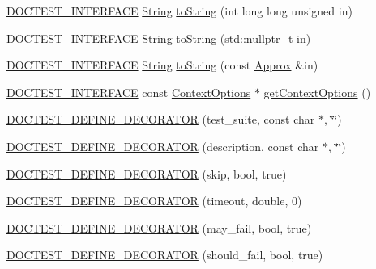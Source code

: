 \begin{DoxyCompactItemize}
\item 
\hyperlink{doctest_8h_a9c16ffc635ec47f07797d21ede26b1a5}{D\+O\+C\+T\+E\+S\+T\+\_\+\+I\+N\+T\+E\+R\+F\+A\+CE} \hyperlink{classdoctest_1_1String}{String} \hyperlink{namespacedoctest_a0996f0f29ee1288fc2363c958fd4fd05}{to\+String} (int long long unsigned in)
\item 
\hyperlink{doctest_8h_a9c16ffc635ec47f07797d21ede26b1a5}{D\+O\+C\+T\+E\+S\+T\+\_\+\+I\+N\+T\+E\+R\+F\+A\+CE} \hyperlink{classdoctest_1_1String}{String} \hyperlink{namespacedoctest_a88b03675f9b7b8afe5e6d4fa15117181}{to\+String} (std\+::nullptr\+\_\+t in)
\item 
\hyperlink{doctest_8h_a9c16ffc635ec47f07797d21ede26b1a5}{D\+O\+C\+T\+E\+S\+T\+\_\+\+I\+N\+T\+E\+R\+F\+A\+CE} \hyperlink{classdoctest_1_1String}{String} \hyperlink{namespacedoctest_a63aa06a8555c5aa34a7a6e76e87a3bca}{to\+String} (const \hyperlink{classdoctest_1_1Approx}{Approx} \&in)
\item 
\hyperlink{doctest_8h_a9c16ffc635ec47f07797d21ede26b1a5}{D\+O\+C\+T\+E\+S\+T\+\_\+\+I\+N\+T\+E\+R\+F\+A\+CE} const \hyperlink{structdoctest_1_1ContextOptions}{Context\+Options} $\ast$ \hyperlink{namespacedoctest_a1ff2f40fd17351e182820848e27e6c79}{get\+Context\+Options} ()
\item 
\hyperlink{namespacedoctest_a104a0e533475e45acbddd9266c4d687e}{D\+O\+C\+T\+E\+S\+T\+\_\+\+D\+E\+F\+I\+N\+E\+\_\+\+D\+E\+C\+O\+R\+A\+T\+OR} (test\+\_\+suite, const char $\ast$, \char`\"{}\char`\"{})
\item 
\hyperlink{namespacedoctest_a07f4a26e2b7cce41abb7d71124951792}{D\+O\+C\+T\+E\+S\+T\+\_\+\+D\+E\+F\+I\+N\+E\+\_\+\+D\+E\+C\+O\+R\+A\+T\+OR} (description, const char $\ast$, \char`\"{}\char`\"{})
\item 
\hyperlink{namespacedoctest_a0ce903d8e37a8fdc185f6e8c73f9b1dd}{D\+O\+C\+T\+E\+S\+T\+\_\+\+D\+E\+F\+I\+N\+E\+\_\+\+D\+E\+C\+O\+R\+A\+T\+OR} (skip, bool, true)
\item 
\hyperlink{namespacedoctest_a09d01a6e97677b7bb508bf925e421963}{D\+O\+C\+T\+E\+S\+T\+\_\+\+D\+E\+F\+I\+N\+E\+\_\+\+D\+E\+C\+O\+R\+A\+T\+OR} (timeout, double, 0)
\item 
\hyperlink{namespacedoctest_a44ea7d81a1561f2222b8ffa69eecc599}{D\+O\+C\+T\+E\+S\+T\+\_\+\+D\+E\+F\+I\+N\+E\+\_\+\+D\+E\+C\+O\+R\+A\+T\+OR} (may\+\_\+fail, bool, true)
\item 
\hyperlink{namespacedoctest_a0da07f59e77fcb14943788b2c85e2355}{D\+O\+C\+T\+E\+S\+T\+\_\+\+D\+E\+F\+I\+N\+E\+\_\+\+D\+E\+C\+O\+R\+A\+T\+OR} (should\+\_\+fail, bool, true)
\item 

\end{DoxyCompactItemize}
